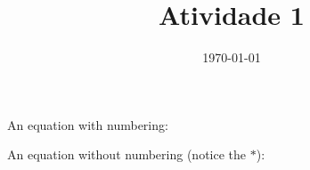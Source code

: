 \documentclass[a4paper, 11pt]{article}
\date{\today}
\title{Atividade 1}
\begin{document}
    \header{}

    \begin{question}
        An equation with numbering:
        \begin{equation}
        \end{equation}

        An equation without numbering (notice the $*$):
        \begin{equation*}
        \end{equation*}
    \end{question}
\end{document}
